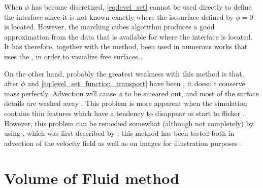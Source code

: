 When $\phi$ has become discretized, \eqref{eq:level_set} cannot be used directly to define the interface since it is not known exactly where the isosurface defined by $\phi = 0$ is located. However, the marching cubes algorithm produces a good approximation from the data that is available for where the interface is located. It has therefore, together with the \LS method, been used in numerous works that uses the \FVM, in order to visualize free surfaces \citep[e.g.][]{Losasso2004}.

On the other hand, probably the greatest weakness with this method is that, after $\phi$ and \eqref{eq:level_set_function_transport} have been \discretized, it doesn't conserve mass perfectly. Advection will cause $\phi$ to be smeared out, and most of the surface details are washed away \citep{Wojtan2009}. This problem is more apparent when the simulation contains thin features which have a tendency to disappear or start to flicker \citep{nthuerey2009}. However, this problem can be remedied somewhat (although not completely) by using \BFECC, which was first described by \citet{Dupont2003}; this method has been tested both in advection of the velocity field as well as on images for illustration purposes \citep{Kim2005}.

\section{Volume of Fluid method}

\label{sec:vof}


